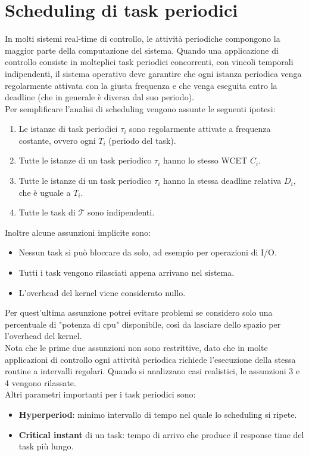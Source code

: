 \documentclass[12pt]{article}
\begin{document}
\section{Scheduling di task periodici}
In molti sistemi real-time di controllo, le attività periodiche compongono la maggior parte della computazione del sistema.
Quando una applicazione di controllo consiste in molteplici task periodici concorrenti, con vincoli temporali indipendenti, il sistema operativo deve garantire che ogni istanza periodica 
venga regolarmente attivata con la giusta frequenza e che venga eseguita entro la deadline (che in generale è diversa dal suo periodo).\\
Per semplificare l'analisi di scheduling vengono assunte le seguenti ipotesi:
\begin{enumerate}
    \label{assunzioni}
    \item Le istanze di task periodici $\tau_i$ sono regolarmente attivate a frequenza costante, ovvero ogni $T_i$ (periodo del task).
    \item Tutte le istanze di un task periodico $\tau_i$ hanno lo stesso WCET $C_i$.
    \item Tutte le istanze di un task periodico $\tau_i$ hanno la stessa deadline relativa $D_i$, che è uguale a $T_i$.
    \item Tutte le task di $\mathcal{T}$ sono indipendenti.
\end{enumerate}
Inoltre alcune assunzioni implicite sono:
\begin{itemize}
    \item Nessun task si può bloccare da solo, ad esempio per operazioni di I/O.
    \item Tutti i task vengono rilasciati appena arrivano nel sistema.
    \item L'overhead del kernel viene considerato nullo.
\end{itemize}
Per quest'ultima assunzione potrei evitare problemi se considero solo una percentuale di "potenza di cpu" disponibile, così da lasciare dello spazio per l'overhead del kernel.\\
Nota che le prime due assunzioni non sono restrittive, dato che in molte applicazioni di controllo ogni attività periodica richiede l'esecuzione della stessa routine a intervalli regolari.
Quando si analizzano casi realistici, le assunzioni 3 e 4 vengono rilassate.
\\
Altri parametri importanti per i task periodici sono:
\begin{itemize}
    \item \textbf{Hyperperiod}: minimo intervallo di tempo nel quale lo scheduling si ripete.
    \item \textbf{Critical instant} di un task: tempo di arrivo che produce il response time del task più lungo.
\end{itemize}
\end{document}
